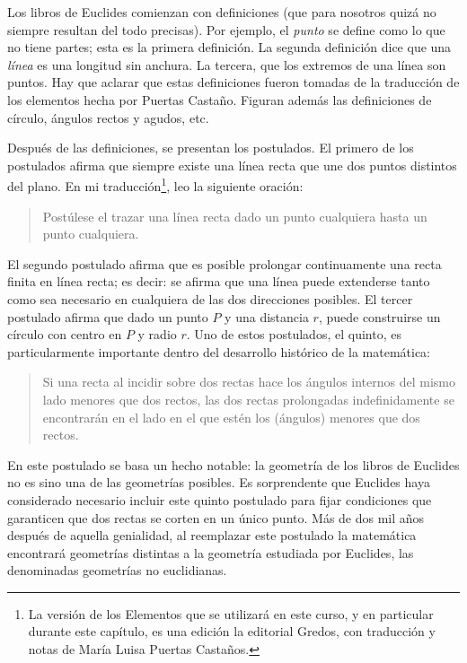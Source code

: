 Los libros de Euclides comienzan con definiciones (que para nosotros quizá no
siempre resultan del todo precisas). Por ejemplo, el \emph{punto} se define
como lo que no tiene partes; esta es la primera definición. La segunda
definición dice que una \emph{línea} es una longitud sin anchura. La tercera,
que los extremos de una línea son puntos. Hay que aclarar que estas
definiciones fueron tomadas de la traducción de los elementos hecha por Puertas
Castaño. Figuran además las definiciones de círculo, ángulos rectos y agudos,
etc.

Después de las definiciones, se presentan los postulados. El primero de los
postulados afirma que siempre existe una línea recta que une dos puntos
distintos del plano. En mi traducción\footnote{La versión de los Elementos que
	se utilizará en este curso, y en particular durante este capítulo, es una
	edición la editorial Gredos, con traducción y notas de María
Luisa Puertas Castaños.}, leo la siguiente oración: 
\begin{quote}
	Postúlese el trazar una línea recta dado un punto cualquiera hasta un punto
	cualquiera. 
\end{quote}
El segundo postulado afirma que es posible prolongar continuamente una recta
finita en línea recta; es decir: se afirma que una línea puede extenderse tanto
como sea necesario en cualquiera de las dos direcciones posibles.  El tercer
postulado afirma que dado un punto $P$ y una distancia $r$, puede construirse
un círculo con centro en $P$ y radio $r$. Uno de estos postulados, el quinto,
es particularmente importante dentro del desarrollo histórico de la matemática: 

\begin{quote}
	Si una recta al incidir sobre dos rectas hace los ángulos internos del
	mismo lado menores que dos rectos, las dos rectas prolongadas
	indefinidamente se encontrarán en el lado en el que estén los (ángulos)
	menores que dos rectos.
\end{quote}

En este postulado se basa un hecho notable: la geometría de los libros de
Euclides no es sino una de las geometrías posibles. Es sorprendente que
Euclides haya considerado necesario incluir este quinto postulado para fijar
condiciones que garanticen que dos rectas se corten en un único punto.  Más de
dos mil años después de aquella genialidad, al reemplazar este postulado la
matemática encontrará geometrías distintas a la geometría estudiada por
Euclides, las denominadas geometrías no euclidianas.

